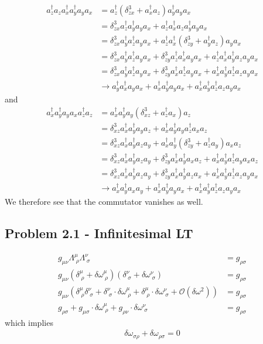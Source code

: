 \documentclass[10pt,a4paper]{book}
\theoremstyle{definition}
\begin{document}
\begin{align}
a^\dagger_za_za^\dagger_xa^\dagger_ya_ya_x
&=a^\dagger_z(\delta^3_{zx}+a^\dagger_xa_z)a^\dagger_ya_ya_x\\
&=\delta^3_{zx}a^\dagger_za^\dagger_ya_ya_x+a^\dagger_za^\dagger_xa_za^\dagger_ya_ya_x\\
&=\delta^3_{zx}a^\dagger_ya^\dagger_za_ya_x+a^\dagger_za^\dagger_x(\delta^3_{zy}+a^\dagger_ya_z)a_ya_x\\
&=\delta^3_{zx}a^\dagger_ya^\dagger_za_ya_x+\delta^3_{zy}a^\dagger_za^\dagger_xa_ya_x+a^\dagger_za^\dagger_xa^\dagger_ya_za_ya_x\\
&=\delta^3_{zx}a^\dagger_ya^\dagger_za_ya_x+\delta^3_{zy}a^\dagger_xa^\dagger_za_ya_x+a^\dagger_xa^\dagger_ya^\dagger_za_za_ya_x\\
&\rightarrow a^\dagger_ya^\dagger_xa_ya_x+a^\dagger_xa^\dagger_ya_ya_x+a^\dagger_xa^\dagger_ya^\dagger_za_za_ya_x
\end{align}
and
\begin{align}
a^\dagger_xa^\dagger_ya_ya_xa^\dagger_za_z
&=a^\dagger_xa^\dagger_ya_y(\delta^3_{xz}+a^\dagger_za_x)a_z\\
&=\delta^3_{xz}a^\dagger_xa^\dagger_ya_ya_z+a^\dagger_xa^\dagger_ya_ya^\dagger_za_xa_z\\
&=\delta^3_{xz}a^\dagger_xa^\dagger_ya_za_y+a^\dagger_xa^\dagger_y(\delta^3_{zy}+a^\dagger_za_y)a_xa_z\\
&=\delta^3_{xz}a^\dagger_xa^\dagger_ya_za_y+\delta^3_{zy}a^\dagger_xa^\dagger_ya_xa_z+a^\dagger_xa^\dagger_ya^\dagger_za_ya_xa_z\\
&=\delta^3_{xz}a^\dagger_xa^\dagger_ya_za_y+\delta^3_{zy}a^\dagger_xa^\dagger_ya_za_x+a^\dagger_xa^\dagger_ya^\dagger_za_za_ya_x\\
&\rightarrow a^\dagger_xa^\dagger_ya_xa_y+a^\dagger_xa^\dagger_ya_ya_x+a^\dagger_xa^\dagger_ya^\dagger_za_za_ya_x
\end{align}
We therefore see that the commutator vanishes as well.

\subsection{Problem 2.1 - Infinitesimal LT}
\begin{align}
g_{\mu\nu}\Lambda^\mu_{\;\rho}\Lambda^\nu_{\;\sigma}&=g_{\rho\sigma}\\
g_{\mu\nu}\left(\delta^\mu_{\;\rho}+\delta\omega^\mu_{\;\rho}\right)\left(\delta^\nu_{\;\sigma}+\delta\omega^\nu_{\;\sigma}\right)&=g_{\rho\sigma}\\
g_{\mu\nu}\left(\delta^\mu_{\;\rho}\delta^\nu_{\;\sigma}+\delta^\nu_{\;\sigma}\cdot\delta\omega^\mu_{\;\rho}+\delta^\mu_{\;\rho}\cdot\delta\omega^\nu_{\;\sigma}+\mathcal{O}(\delta\omega^2)\right)&=g_{\rho\sigma}\\
g_{\rho\sigma}+g_{\mu\sigma}\cdot\delta\omega^\mu_{\;\rho}+g_{\rho\nu}\cdot\delta\omega^\nu_{\;\sigma}&=g_{\rho\sigma}
\end{align}
which implies
\begin{align}
\delta\omega_{\sigma\rho}+\delta\omega_{\rho\sigma}=0
\end{align}
\end{document}
